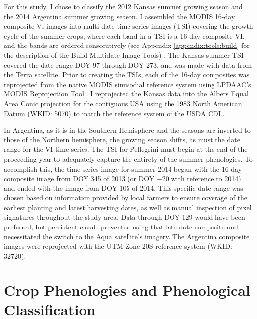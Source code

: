 For this study, I chose to classify the 2012 Kansas summer growing season and the 2014 Argentina summer growing season. I assembled the MODIS 16-day composite VI images into multi-date time-series images (TSI) covering the growth cycle of the summer crops, where each band in a TSI is a 16-day composite VI, and the bands are ordered consecutively (see Appendix \ref{appendix:tools:build} for the description of the Build Multidate Image Tools) . The Kansas summer TSI covered the date range DOY 97 through DOY 273, and was made with data from the Terra satellite. Prior to creating the TSIs, each of the 16-day composites was reprojected from the native MODIS sinusodial reference system using LPDAAC's MODIS Reprojection Tool . I reprojected the Kansas data into the Albers Equal Area Conic projection for the contiguous USA using the 1983 North American Datum (WKID: 5070) to match the reference system of the USDA CDL.

In Argentina, as it is in the Southern Hemisphere and the seasons are inverted to those of the Northern hemisphere, the growing season shifts, as must the date range for the VI time-series. The TSI for Pellegrini must begin at the end of the proceeding year to adequately capture the entirety of the summer phenologies. To accomplish this, the time-series image for summer 2014 began with the 16-day composite image from DOY 345 of 2013 (or DOY −20 with reference to 2014) and ended with the image from DOY 105 of 2014. This specific date range was chosen based on information provided by local farmers to ensure coverage of the earliest planting and latest harvesting dates, as well as manual inspection of pixel signatures throughout the study area. Data through DOY 129 would have been preferred, but persistent clouds prevented using that late-date composite and necessitated the switch to the Aqua satellite's imagery. The Argentina composite images were reprojected with the UTM Zone 20S reference system (WKID: 32720).

\section{Crop Phenologies and Phenological Classification}
\label{chapter:methods:phenology-fitting}

